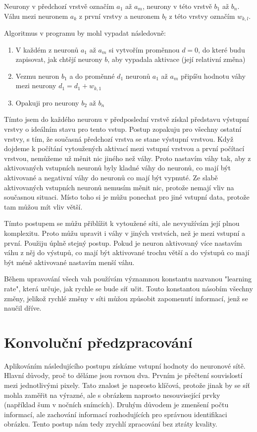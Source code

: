 \documentclass[12pt,a4paper]{report}
\begin{document}
	Neurony v předchozí vrstvě označím $a_1$ až $a_m$, neurony v této vrstvě $b_1$ až $b_n$. Váhu mezi neuronem $a_k$ z první vrstvy a neuronem $b_l$ z této vrstvy označím $w_{k,l}$.
	
	Algoritmus v programu by mohl vypadat následovně:
	\begin{enumerate}
		\item V každém z neuronů $a_1$ až $a_m$ si vytvořím proměnnou $d=0$, do které budu zapisovat, jak chtějí neurony $b$, aby vypadala aktivace (její relativní změna)
		\item Vezmu neuron $b_1$ a do proměnné $d_1$ neuronů $a_1$ až $a_m$ připíšu hodnotu váhy mezi neurony $d_1=d_1+w_{k,1}$
		\item Opakuji pro neurony $b_2$ až $b_n$
	\end{enumerate}
	Tímto jsem do každého neuronu v předposlední vrstvě získal představu výstupní vrstvy o ideálním stavu pro tento vstup. Postup zopakuju pro všechny ostatní vrstvy, s tím, že současná předchozí vrstva se stane výstupní vrstvou. Když dojdeme k počítání vytoužených aktivací mezi vstupní vrstvou a první počítací vrstvou, nemůžeme už měnit nic jiného než váhy. Proto nastavím váhy tak, aby z aktivovaných vstupních neuronů byly kladné váhy do neuronů, co mají být aktivované a negativní váhy do neuronů co mají být vypnuté. Ze slabě aktivovaných vstupních neuronů nemusím měnit nic, protože nemají vliv na současnou situaci. Místo toho si je můžu ponechat pro jiné vstupní data, protože tam můžou mít vliv větší.
	
	Tímto postupem se můžu přiblížit k vytoužené síti, ale nevyužívám její plnou komplexitu. Proto můžu upravit i váhy v jiných vrstvách, než je mezi vstupní a první. Použiju úplně stejný postup. Pokud je neuron aktivovaný více nastavím váhu z něj do výstupů, co mají být aktivované trochu větší a do výstupů co mají být méně aktivované nastavím menší váhu.
	
	Během upravování všech vah používám významnou konstantu nazvanou "learning rate", která určuje, jak rychle se bude síť učit. Touto konstantou násobím všechny změny, jelikož rychlé změny v síti můžou způsobit zapomenutí informací, jenž se naučil dříve.
	
\chapter{Konvoluční předzpracování}
Aplikováním následujícího postupu získáme vstupní hodnoty do neuronové sítě. Hlavní důvody, proč to děláme jsou rovnou dva. Prvním je přečtení souvislostí mezi jednotlivými pixely. Tato znalost je naprosto klíčová, protože jinak by se síť mohla zaměřit na výrazné, ale s obrázkem naprosto nesouvisející prvky (například šum v nočních snímcích). Druhým důvodem je zmenšení počtu informací, ale zachování informací rozhodujících pro správnou identifikaci obrázku. Tento postup nám tedy zrychlí zpracování bez ztráty kvality.
\end{document}
